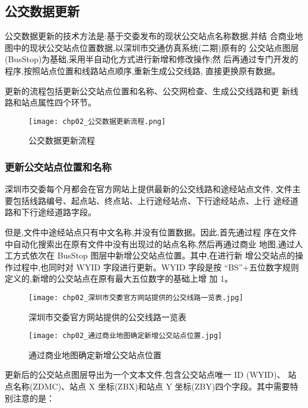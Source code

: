 \subsection{公交数据更新}
公交数据更新的技术方法是:基于交委发布的现状公交站点名称数据,并结
合商业地图中的现状公交站点位置数据,以深圳市交通仿真系统(二期)原有的
公交站点图层(BusStop)为基础,采用半自动化方式进行新增和修改操作;然
后再通过专门开发的程序,按照站点位置和线路站点顺序,重新生成公交线路,
直接更换原有数据。

更新的流程包括更新公交站点位置和名称、公交网检查、生成公交线路和更
新线路和站点属性四个环节。

\begin{figure}[ht]
  \centering
  \texttt{[image: chp02\_公交数据更新流程.png]}
  \caption{公交数据更新流程\label{fig:公交数据更新流程} }
\end{figure}

\subsubsection{更新公交站点位置和名称} \label{subsubsec:更新公交站点位置和名称}
深圳市交委每个月都会在官方网站上提供最新的公交线路和途经站点文件,
文件主要包括线路编号、起点站、终点站、上行途经站点、下行途经站点、上行
途经道路和下行途经道路字段。

但是,文件中途经站点只有中文名称,并没有位置数据。因此,首先通过程
序在文件中自动化搜索出在原有文件中没有出现过的站点名称,然后再通过商业
地图,通过人工方式依次在 BusStop 图层中新增公交站点位置。其中,在进行新
增公交站点的操作过程中,也同时对 WYID 字段进行更新。WYID 字段是按
“BS”+五位数字规则定义的,新增的公交站点在原有最大五位数字的基础上增
加 1。

\begin{figure}[!ht]
  \centering
  \texttt{[image: chp02\_深圳市交委官方网站提供的公交线路一览表.jpg]}
  \caption{深圳市交委官方网站提供的公交线路一览表\label{fig:深圳市交委官方网站提供的公交线路一览表} }
\end{figure}

\begin{figure}[!ht]
  \centering
  \texttt{[image: chp02\_通过商业地图确定新增公交站点位置.jpg]}
  \caption{通过商业地图确定新增公交站点位置\label{fig:通过商业地图确定新增公交站点位置} }
\end{figure}

更新后的公交站点图层导出为一个文本文件,包含公交站点唯一 ID (WYID)、
站点名称(ZDMC)、站点 X 坐标(ZBX)和站点 Y 坐标(ZBY)四个字段。其中需要特别注意的是：

